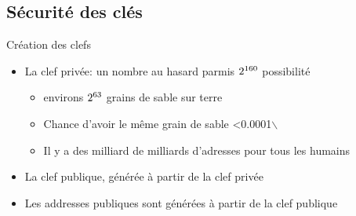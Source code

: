 \documentclass[presentation]{beamer}
\begin{document}
\subsection{Sécurité des clés}
\label{sec:org201c967}

\begin{frame}[label={sec:orgf78bf71}]{Création des clefs}
\begin{itemize}
\item La clef privée: un nombre au hasard parmis \(2\textsuperscript{160}\) possibilité
\begin{itemize}
\item environs \(2\textsuperscript{63}\) grains de sable sur terre
\item Chance d'avoir le même grain de sable <0.0001$\backslash$%
\item Il y a des milliard de milliards d'adresses pour tous les humains
\end{itemize}
\item La clef publique, générée à partir de la clef privée
\item Les addresses publiques sont générées à partir de la clef publique
\end{itemize}
\end{frame}
\end{document}
